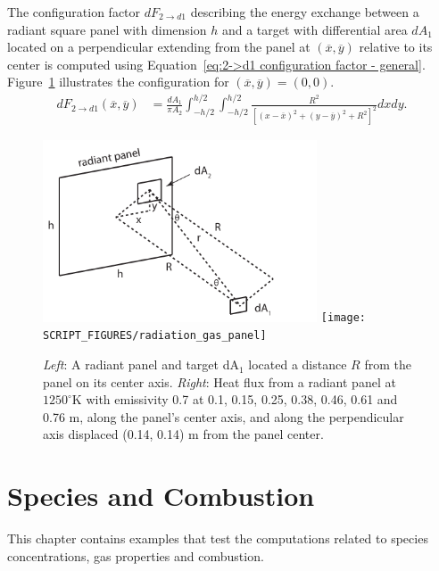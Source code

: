 \documentclass[11pt]{book}
\begin{document}
The configuration factor $dF_{2 \rightarrow d1}$ describing the energy
exchange between a radiant square panel with dimension $h$ and a
target with differential area $dA_1$ located on a perpendicular
extending from the panel at $(\overline{x}, \overline{y})$ relative to
its center is computed using Equation~\eqref{eq:2->d1 configuration
  factor - general}. Figure~\ref{radiation_gas_panel_plot} illustrates
the configuration for $(\overline{x}, \overline{y}) = (0, 0)$. 
\begin{align}
 dF_{2 \rightarrow d1} (\overline{x}, \overline{y}) 
    &= \frac{dA_1}{\pi A_2}
        \int_{-h/2}^{h/2} \int_{-h/2}^{h/2} \frac{R^2}{\left[ (x-\overline{x})^2 + (y-\overline{y})^2 + R^2 \right]^2} dx dy.
 \label{eq:2->d1 configuration factor - general}
\end{align}
  
\begin{figure}[ht]
\centering
\includegraphics[width=3.2in]{FIGURES/radiation_gas_panel_configuration}
\texttt{[image: SCRIPT\_FIGURES/radiation\_gas\_panel]}
\caption[The  case]{\emph{Left}: A
  radiant panel and target dA$_1$ located a distance $R$ from
  the panel on its center axis.  \emph{Right}: Heat flux from a
  radiant panel at $1250^\circ$K  with emissivity 0.7 at 0.1, 0.15,
  0.25, 0.38, 0.46, 0.61 and 0.76 m, along the panel's center axis,
  and along the perpendicular axis displaced (0.14, 0.14) m from the
  panel center.}
\label{radiation_gas_panel_plot}
\end{figure}



\chapter{Species and Combustion}

This chapter contains examples that test the computations related to species concentrations, gas properties and combustion.
\end{document}
